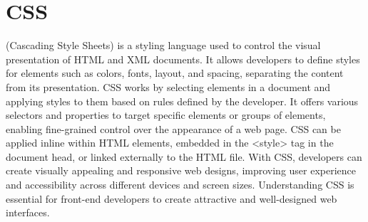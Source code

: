 \chapter{CSS}
\thispagestyle{fancy}
\lstset{language=CSS, style=cssstyle}

 (Cascading Style Sheets) is a styling language used to control the visual presentation of HTML and XML documents. It allows developers to define styles for elements such as colors, fonts, layout, and spacing, separating the content from its presentation. CSS works by selecting elements in a document and applying styles to them based on rules defined by the developer. It offers various selectors and properties to target specific elements or groups of elements, enabling fine-grained control over the appearance of a web page. CSS can be applied inline within HTML elements, embedded in the <style> tag in the document head, or linked externally to the HTML file. With CSS, developers can create visually appealing and responsive web designs, improving user experience and accessibility across different devices and screen sizes. Understanding CSS is essential for front-end developers to create attractive and well-designed web interfaces.
